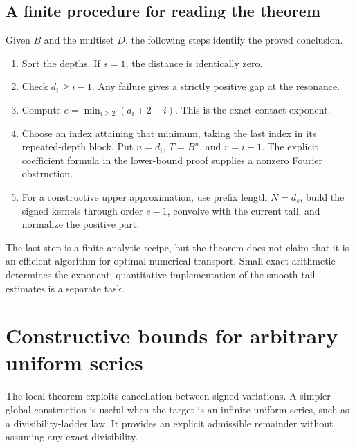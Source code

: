 \documentclass[11pt,letterpaper]{article}
\theoremstyle{definition}
\theoremstyle{remark}
\begin{document}
\subsection{A finite procedure for reading the theorem}
Given $B$ and the multiset $D$, the following steps identify the proved conclusion.
\begin{enumerate}
\item Sort the depths. If $s=1$, the distance is identically zero.
\item Check $d_i\ge i-1$. Any failure gives a strictly positive gap at the resonance.
\item Compute $e=\min_{i\ge2}(d_i+2-i)$. This is the exact contact exponent.
\item Choose an index attaining that minimum, taking the last index in its repeated-depth block. Put $n=d_i$, $T=B^n$, and $r=i-1$. The explicit coefficient formula in the lower-bound proof supplies a nonzero Fourier obstruction.
\item For a constructive upper approximation, use prefix length $N=d_s$, build the signed kernels through order $e-1$, convolve with the current tail, and normalize the positive part.
\end{enumerate}
The last step is a finite analytic recipe, but the theorem does not claim that it is an efficient algorithm for optimal numerical transport. Small exact arithmetic determines the exponent; quantitative implementation of the smooth-tail estimates is a separate task.

\section{Constructive bounds for arbitrary uniform series}\label{sec:ladders}

The local theorem exploits cancellation between signed variations. A simpler global construction is useful when the target is an infinite uniform series, such as a divisibility-ladder law. It provides an explicit admissible remainder without assuming any exact divisibility.
\end{document}
